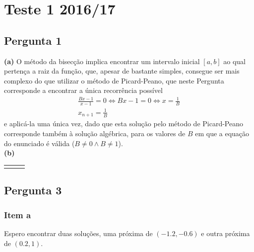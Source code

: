 \setcounter{chapter}{16}
\chapter{Teste 1 2016/17}
\section{Pergunta 1}
\textbf{(a)} O método da bisecção implica encontrar um intervalo inicial $[a,b]$ ao qual pertença a raiz da função, que, apesar de bastante simples, consegue ser mais complexo do que utilizar o método de Picard-Peano, que neste Pergunta corresponde a encontrar a única recorrência possível
\begin{gather*}
	\frac{Bx-1}{x-1}=0 \iff Bx-1=0 \iff x=\frac{1}{B}\\
	x_{n+1}=\frac{1}{B}
\end{gather*}
e aplicá-la uma única vez, dado que esta solução pelo método de Picard-Peano corresponde também à solução algébrica, para os valores de $B$ em que a equação do enunciado é válida ($B\neq 0 \wedge B\neq 1$).\\
\textbf{(b)}

\begin{center}
\begin{tabular}{ p{73mm} p{0mm} p{73mm} }
	 & &
	
\end{tabular}
\end{center}

\section{Pergunta 3}
\subsection{Item a}
Espero encontrar duas soluções, uma próxima de $(-1.2,-0.6)$ e outra próxima de $(0.2,1)$.

\newpage
